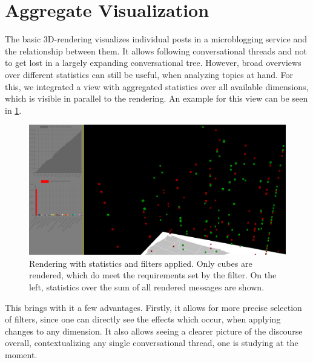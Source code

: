 \section{Aggregate Visualization}
The basic 3D-rendering visualizes individual posts in a microblogging service and the relationship between them. It allows following conversational threads and not to get lost in a largely expanding conversational tree. However, broad overviews over different statistics can still be useful, when analyzing topics at hand. For this, we integrated a view with aggregated statistics over all available dimensions, which is visible in parallel to the rendering. An example for this view can be seen in \ref{fig:viz3}.
\begin{figure}
  \includegraphics[width=\linewidth]{figures/stats.PNG}
  \caption{Rendering with statistics and filters applied. Only cubes are rendered, which do meet the requirements set by the filter. On the left, statistics over the sum of all rendered messages are shown.}
  \label{fig:viz3}
\end{figure}

This brings with it a few advantages. Firstly, it allows for more precise selection of filters, since one can directly see the effects which occur, when applying changes to any dimension. It also allows seeing a clearer picture of the discourse overall, contextualizing any single conversational thread, one is studying at the moment.